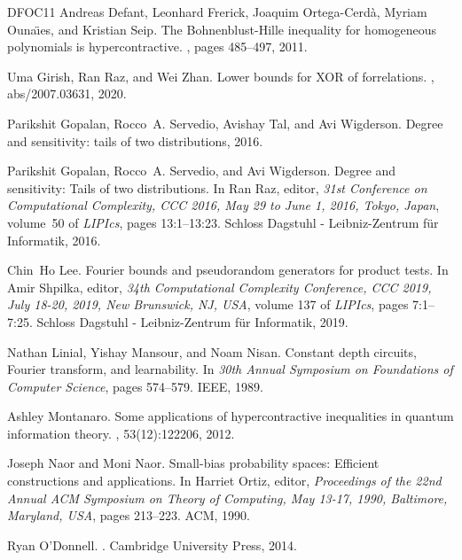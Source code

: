 \documentclass[10pt,a4paper]{article}
\theoremstyle{definition}
\begin{document}
\begin{thebibliography}{DFOC{\etalchar{+}}11}
Andreas Defant, Leonhard Frerick, Joaquim Ortega-Cerd{\`a}, Myriam
  Ouna{\"\i}es, and Kristian Seip.
\newblock The {B}ohnenblust-{H}ille inequality for homogeneous polynomials is
  hypercontractive.
, pages 485--497, 2011.

Uma Girish, Ran Raz, and Wei Zhan.
\newblock Lower bounds for {XOR} of forrelations.
, abs/2007.03631, 2020.

Parikshit Gopalan, Rocco~A. Servedio, Avishay Tal, and Avi Wigderson.
\newblock Degree and sensitivity: tails of two distributions, 2016.

Parikshit Gopalan, Rocco~A. Servedio, and Avi Wigderson.
\newblock Degree and sensitivity: Tails of two distributions.
\newblock In Ran Raz, editor, {\em 31st Conference on Computational Complexity,
  {CCC} 2016, May 29 to June 1, 2016, Tokyo, Japan}, volume~50 of {\em LIPIcs},
  pages 13:1--13:23. Schloss Dagstuhl - Leibniz-Zentrum f{\"{u}}r Informatik,
  2016.

Chin~Ho Lee.
\newblock Fourier bounds and pseudorandom generators for product tests.
\newblock In Amir Shpilka, editor, {\em 34th Computational Complexity
  Conference, {CCC} 2019, July 18-20, 2019, New Brunswick, NJ, {USA}}, volume
  137 of {\em LIPIcs}, pages 7:1--7:25. Schloss Dagstuhl - Leibniz-Zentrum
  f{\"{u}}r Informatik, 2019.

Nathan Linial, Yishay Mansour, and Noam Nisan.
\newblock Constant depth circuits, {F}ourier transform, and learnability.
\newblock In {\em 30th Annual Symposium on Foundations of Computer Science},
  pages 574--579. IEEE, 1989.

Ashley Montanaro.
\newblock Some applications of hypercontractive inequalities in quantum
  information theory.
, 53(12):122206, 2012.

Joseph Naor and Moni Naor.
\newblock Small-bias probability spaces: Efficient constructions and
  applications.
\newblock In Harriet Ortiz, editor, {\em Proceedings of the 22nd Annual {ACM}
  Symposium on Theory of Computing, May 13-17, 1990, Baltimore, Maryland,
  {USA}}, pages 213--223. {ACM}, 1990.

Ryan O'Donnell.
.
\newblock Cambridge University Press, 2014.


\end{thebibliography}
\end{document}
